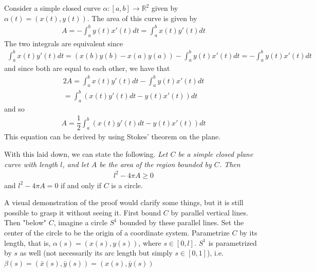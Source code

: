 \documentclass{article}
\newcommand{\R}{\mathbb{R}}
\begin{document}
	Consider a simple closed curve $\alpha: [a, b] \to \R^2$ given by $\alpha(t) = \left( x(t), y(t) \right)$. The area of this curve is given by
	\begin{gather*}
		A = - \int_a^b y(t) x'(t) dt = \int_a^b x(t) y'(t) dt
	\end{gather*}
	The two integrals are equivalent since
	\begin{gather*}
		\int_a^b x(t) y'(t) dt = \left( x(b) y(b) - x(a) y(a) \right) - \int_a^b y(t) x'(t) dt = - \int_a^b y(t) x'(t) dt
	\end{gather*}
	and since both are equal to each other, we have that
	\begin{gather*}
		2A = \int_a^b x(t) y'(t) dt - \int_a^b y(t) x'(t) dt \\
		= \int_a^b \left( x(t) y'(t) dt - y(t) x'(t) \right) dt
	\end{gather*}
	and so
	\begin{gather*}
		A = \dfrac{1}{2} \int_a^b \left( x(t) y'(t) dt - y(t) x'(t) \right) dt
	\end{gather*}
	This equation can be derived by using Stokes' theorem on the plane.
	
	With this laid down, we can state the following. \textit{Let $C$ be a simple closed plane curve with length $l$, and let $A$ be the area of the region bounded by $C$. Then}
	\begin{gather*}
		l^2 - 4\pi A \geq 0
	\end{gather*}
	and $l^2 - 4\pi A = 0$ if and only if $C$ is a circle.
	
	A visual demonstration of the proof would clarify some things, but it is still possible to grasp it without seeing it. First bound $C$ by parallel vertical lines. Then "below" $C$, imagine a circle $S^1$ bounded by these parallel lines. Set the center of the circle to be the origin of a coordinate system. Parametrize $C$ by its length, that is, $\alpha(s) = \left( x(s), y(s) \right)$, where $s \in [0, l]$. $S^1$ is parametrized by $s$ as well (not necessarily its arc length but simply $s \in [0, 1]$), i.e. $\beta(s) = \left( \bar{x}(s), \bar{y}(s) \right) = \left( x(s), \bar{y}(s) \right)$
	
\end{document}
